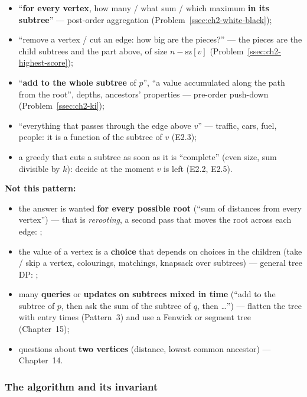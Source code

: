 \begin{itemize}[leftmargin=*]
    \item ``\textbf{for every vertex}, how many / what sum / which maximum \textbf{in its subtree}'' --- post-order aggregation (Problem~\ref{ssec:ch2-white-black});
    \item ``remove a vertex / cut an edge: how big are the pieces?'' --- the pieces are the child subtrees and the part above, of size $n - \mathrm{sz}[v]$ (Problem~\ref{ssec:ch2-highest-score});
    \item ``\textbf{add to the whole subtree} of $p$'', ``a value accumulated along the path from the root'', depths, ancestors' properties --- pre-order push-down (Problem~\ref{ssec:ch2-ki});
    \item ``everything that passes through the edge above $v$'' --- traffic, cars, fuel, people: it is a function of the subtree of $v$ (E2.3);
    \item a greedy that cuts a subtree as soon as it is ``complete'' (even size, sum divisible by $k$): decide at the moment $v$ is left (E2.2, E2.5).
\end{itemize}
\textbf{Not this pattern:}
\begin{itemize}[leftmargin=*]
    \item the answer is wanted \textbf{for every possible root} (``sum of distances from every vertex'') --- that is \emph{rerooting}, a second pass that moves the root across each edge: ;
    \item the value of a vertex is a \textbf{choice} that depends on choices in the children (take / skip a vertex, colourings, matchings, knapsack over subtrees) --- general tree DP: ;
    \item many \textbf{queries} or \textbf{updates on subtrees mixed in time} (``add to the subtree of $p$, then ask the sum of the subtree of $q$, then \dots'') --- flatten the tree with entry times (Pattern~3) and use a Fenwick or segment tree (Chapter~15);
    \item questions about \textbf{two vertices} (distance, lowest common ancestor) --- Chapter~14.
\end{itemize}

\subsubsection*{The algorithm and its invariant}

